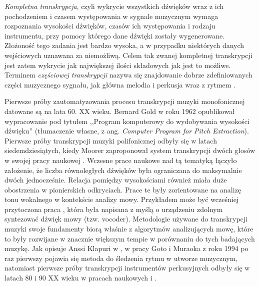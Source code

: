 \documentclass[12pt,a4paper,twoside]{mwart}
\begin{document}
\textit{Kompletna transkrypcja}, czyli wykrycie wszystkich dźwięków wraz z ich pochodzeniem i czasem występowania w sygnale muzycznym wymaga rozpoznania wysokości dźwięków, czasów ich występowania i rodzaju instrumentu, przy pomocy którego dane dźwięki zostały wygenerowane. Złożoność tego zadania jest bardzo wysoka, a w przypadku niektórych danych wejściowych uznawana za niemożliwą. Celem tak zwanej kompletnej transkrypcji jest zatem wykrycie jak największej ilości składowych jak jest to możliwe. Terminem \textit{częściowej transkrypcji} nazywa się znajdowanie dobrze zdefiniowanych części muzycznego sygnału, jak główna melodia i perkusja wraz z rytmem 
\cite[3-7]{Transcription:Anssi:SignalProcessingMethods}
.

Pierwsze próby zautomatyzowania procesu transkrypcji muzyki monofonicznej datowane są na lata 60. XX wieku. Bernard Gold w roku 1962 opublikował wypracowanie pod tytułem ,,Program komputerowy do wydobywania wysokości dźwięku'' \cite{Transcription:Gold:ComputerProgramForPitchExtraction} (tłumaczenie własne, z ang. \textit{Computer Program for Pitch Extraction}). Pierwsze próby transkrypcji muzyki polifonicznej odbyły się w latach siedemdziesiątych, kiedy Moorer zaproponował system transkrypcji dwóch głosów w swojej pracy naukowej \cite{Transcription:Moorer:OnTheTranscriptionOfMusicalSOundByComputer}. Wczesne prace naukowe nad tą tematyką łączyło założenie, że liczba równoległych dźwięków była ograniczana do maksymalnie dwóch jednocześnie. Relacja pomiędzy wysokościami również miała duże obostrzenia w pionierskich odkryciach. Prace te były zorientowane na analizę tonu wokalnego w kontekście analizy mowy. Przykładem może być wcześniej przytoczona praca \cite{Transcription:Gold:ComputerProgramForPitchExtraction}, która była napisana z myślą o urządzeniu zdolnym syntezować dźwięk mowy (tzw. vocoder). Metodologie używane do transkrypcji muzyki swoje fundamenty biorą właśnie z algorytmów analizujących mowę, które to były rozwijane w znacznie większym tempie w porównaniu do tych badających muzykę. Jak opisuje Anssi Klapuri w 
\cite[6]{Transcription:Anssi:SignalProcessingMethods}
, w pracy Goto i Muraoka z roku 1994 \cite{Transcription::FirstRythm} po raz pierwszy pojawia się metoda do śledzenia rytmu w utworze muzycznym, natomiast pierwsze próby transkrypcji instrumentów perkusyjnych odbyły się w latach 80 i 90 XX wieku w pracach naukowych 
\cite[99-104]{Transcription:Schloss:AutomaticTranscriptionOfPercussiveMusic}
 i \cite[77-84]{Transcription:Bilmes:TimingIsOfTHeEssence}.
\end{document}
